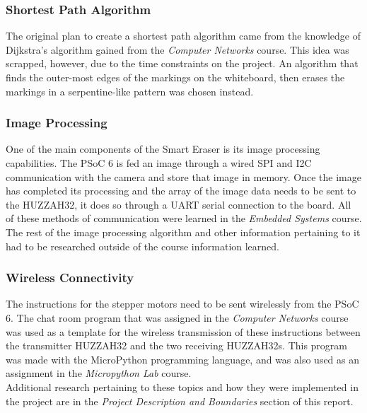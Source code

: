 \subsubsection{Shortest Path Algorithm}
The original plan to create a shortest path algorithm came from the knowledge of Dijkstra's algorithm gained from the \textit{Computer Networks} course. This idea was scrapped, however, due to the time constraints on the project. An algorithm that finds the outer-most edges of the markings on the whiteboard, then erases the markings in a serpentine-like pattern was chosen instead.\\

\subsubsection{Image Processing}
One of the main components of the Smart Eraser is its image processing capabilities. The PSoC 6 is fed an image through a wired SPI and I2C communication with the camera and store that image in memory. Once the image has completed its processing and the array of the image data needs to be sent to the HUZZAH32, it does so through a UART serial connection to the board. All of these methods of communication were learned in the \textit{Embedded Systems} course. The rest of the image processing algorithm and other information pertaining to it had to be researched outside of the course information learned.\\

\subsubsection{Wireless Connectivity}
The instructions for the stepper motors need to be sent wirelessly from the PSoC 6. The chat room program that was assigned in the \textit{Computer Networks} course was used as a template for the wireless transmission of these instructions between the transmitter HUZZAH32 and the two receiving HUZZAH32s. This program was made with the MicroPython programming language, and was also used as an assignment in the \textit{Micropython Lab} course.\\

Additional research pertaining to these topics and how they were implemented in the project are in the \textit{Project Description and Boundaries} section of this report.   

